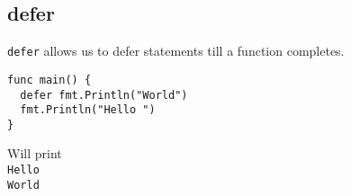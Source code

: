 \subsection{defer}
\texttt{defer} allows us to defer statements till a function completes.
\begin{lstlisting}
func main() {
  defer fmt.Println("World")
  fmt.Println("Hello ")
}\end{lstlisting}

Will print \\
\texttt{Hello \\
World}
